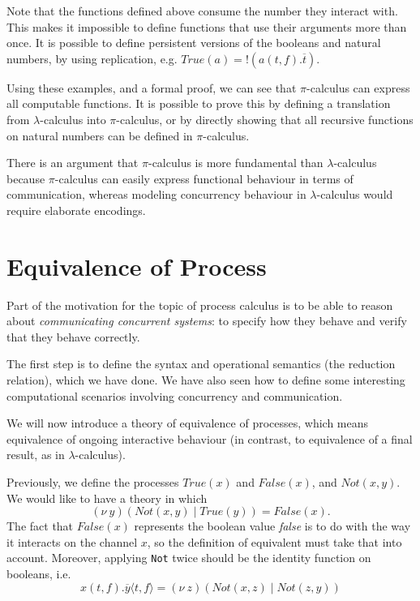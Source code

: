 \documentclass[a4paper, openany]{memoir}
\theoremstyle{definition}
\begin{document}
    Note that the functions defined above consume the number they interact with. This makes it impossible to define functions that use their arguments more than once. It is possible to define persistent versions of the booleans and natural numbers, by using replication, e.g. $\textit{True}(a) = !(a(t, f).\overline{t})$.

    Using these examples, and a formal proof, we can see that $\pi$-calculus can express all computable functions. It is possible to prove this by defining a translation from $\lambda$-calculus into $\pi$-calculus, or by directly showing that all recursive functions on natural numbers can be defined in $\pi$-calculus.

    There is an argument that $\pi$-calculus is more fundamental than $\lambda$-calculus because $\pi$-calculus can easily express functional behaviour in terms of communication, whereas modeling concurrency behaviour in $\lambda$-calculus would require elaborate encodings.
    \newpage

    \section{Equivalence of Process}
    Part of the motivation for the topic of process calculus is to be able to reason about \emph{communicating concurrent systems}: to specify how they behave and verify that they behave correctly.

    The first step is to define the syntax and operational semantics (the reduction relation), which we have done. We have also seen how to define some interesting computational scenarios involving concurrency and communication.

    We will now introduce a theory of equivalence of processes, which means equivalence of ongoing interactive behaviour (in contrast, to equivalence of a final result, as in $\lambda$-calculus).

    Previously, we define the processes $\textit{True}(x)$ and $\textit{False}(x)$, and $\textit{Not}(x, y)$. We would like to have a theory in which
    \[(\nu \ y)(\textit{Not}(x, y) \mid \textit{True}(y)) = \textit{False}(x).\]
    The fact that $\textit{False}(x)$ represents the boolean value \textit{false} is to do with the way it interacts on the channel $x$, so the definition of equivalent must take that into account. Moreover, applying \texttt{Not} twice should be the identity function on booleans, i.e.
    \[x(t, f).\overline{y} \langle t, f \rangle = (\nu \ z)(\textit{Not}(x, z) \mid \textit{Not}(z, y))\]
\end{document}
